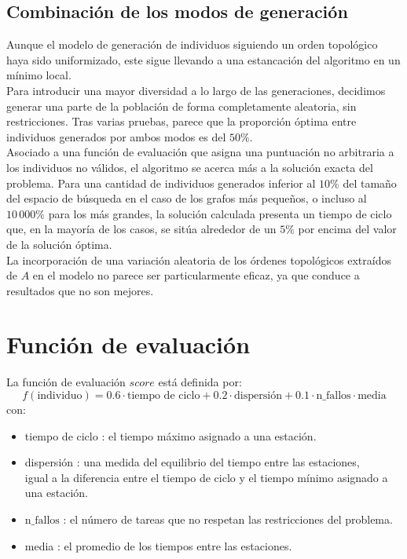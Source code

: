 \documentclass[12pt]{report}
\begin{document}
\subsection*{Combinación de los modos de generación}

Aunque el modelo de generación de individuos siguiendo un orden topológico haya sido uniformizado, este sigue llevando a una estancación del algoritmo en un mínimo local.\\

Para introducir una mayor diversidad a lo largo de las generaciones, decidimos generar una parte de la población de forma completamente aleatoria, sin restricciones. Tras varias pruebas, parece que la proporción óptima entre individuos generados por ambos modos es del $50\%$.\\

Asociado a una función de evaluación que asigna una puntuación no arbitraria a los individuos no válidos, el algoritmo se acerca más a la solución exacta del problema. Para una cantidad de individuos generados inferior al $10\%$ del tamaño del espacio de búsqueda en el caso de los grafos más pequeños, o incluso al $10\,000\%$ para los más grandes, la solución calculada presenta un tiempo de ciclo que, en la mayoría de los casos, se sitúa alrededor de un $5\%$ por encima del valor de la solución óptima.\\

La incorporación de una variación aleatoria de los órdenes topológicos extraídos de $A$ en el modelo no parece ser particularmente eficaz, ya que conduce a resultados que no son mejores.

\section{Función de evaluación}

La función de evaluación $score$ está definida por: \\
\[
f(\text{individuo}) = 0.6 \cdot \text{tiempo de ciclo} + 0.2 \cdot \text{dispersión} + 0.1 \cdot \text{n\_fallos} \cdot \text{media}
\]
con:\\
\begin{itemize}
\item tiempo de ciclo : el tiempo máximo asignado a una estación.
\item dispersión : una medida del equilibrio del tiempo entre las estaciones,\\
igual a la diferencia entre el tiempo de ciclo y el tiempo mínimo asignado a una estación.
\item $\text{n\_fallos}$ : el número de tareas que no respetan las restricciones del problema.
\item media : el promedio de los tiempos entre las estaciones.
\end{itemize}
\end{document}
